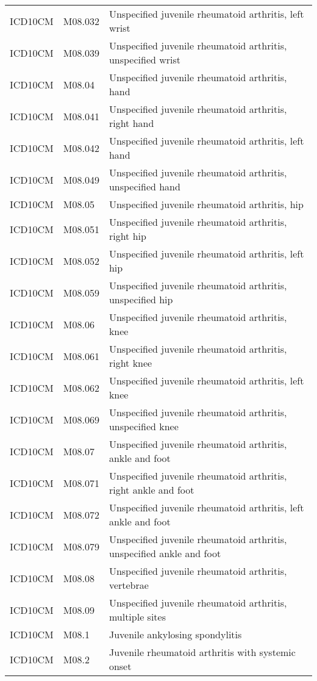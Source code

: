 \begin{longtable}{p{}p{}p{}}
  ICD10CM & M08.032 & Unspecified juvenile rheumatoid arthritis, left wrist \\ 
  ICD10CM & M08.039 & Unspecified juvenile rheumatoid arthritis, unspecified wrist \\ 
  ICD10CM & M08.04 & Unspecified juvenile rheumatoid arthritis, hand \\ 
  ICD10CM & M08.041 & Unspecified juvenile rheumatoid arthritis, right hand \\ 
  ICD10CM & M08.042 & Unspecified juvenile rheumatoid arthritis, left hand \\ 
  ICD10CM & M08.049 & Unspecified juvenile rheumatoid arthritis, unspecified hand \\ 
  ICD10CM & M08.05 & Unspecified juvenile rheumatoid arthritis, hip \\ 
  ICD10CM & M08.051 & Unspecified juvenile rheumatoid arthritis, right hip \\ 
  ICD10CM & M08.052 & Unspecified juvenile rheumatoid arthritis, left hip \\ 
  ICD10CM & M08.059 & Unspecified juvenile rheumatoid arthritis, unspecified hip \\ 
  ICD10CM & M08.06 & Unspecified juvenile rheumatoid arthritis, knee \\ 
  ICD10CM & M08.061 & Unspecified juvenile rheumatoid arthritis, right knee \\ 
  ICD10CM & M08.062 & Unspecified juvenile rheumatoid arthritis, left knee \\ 
  ICD10CM & M08.069 & Unspecified juvenile rheumatoid arthritis, unspecified knee \\ 
  ICD10CM & M08.07 & Unspecified juvenile rheumatoid arthritis, ankle and foot \\ 
  ICD10CM & M08.071 & Unspecified juvenile rheumatoid arthritis, right ankle and foot \\ 
  ICD10CM & M08.072 & Unspecified juvenile rheumatoid arthritis, left ankle and foot \\ 
  ICD10CM & M08.079 & Unspecified juvenile rheumatoid arthritis, unspecified ankle and foot \\ 
  ICD10CM & M08.08 & Unspecified juvenile rheumatoid arthritis, vertebrae \\ 
  ICD10CM & M08.09 & Unspecified juvenile rheumatoid arthritis, multiple sites \\ 
  ICD10CM & M08.1 & Juvenile ankylosing spondylitis \\ 
  ICD10CM & M08.2 & Juvenile rheumatoid arthritis with systemic onset \\ 

\end{longtable}
